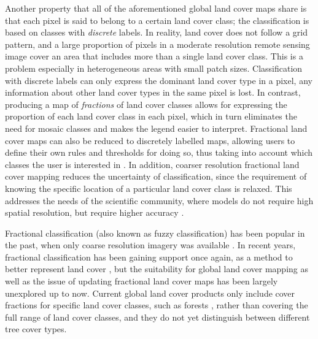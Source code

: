 \documentclass[10pt]{article}
\begin{document}
\begin{mdframed}[style=table,frametitle=\textbf{7. DETAILED DESCRIPTION OF THE RESEARCH PLAN} (max. 2500 words + 1 page literature list)]
Another property that all of the aforementioned global land cover maps share is that each pixel is said to belong to a certain land cover class; the classification is based on classes with \textit{discrete} labels. In reality, land cover does not follow a grid pattern, and a large proportion of pixels in a moderate resolution remote sensing image cover an area that includes more than a single land cover class. This is a problem especially in heterogeneous areas with small patch sizes. Classification with discrete labels can only express the dominant land cover type in a pixel, any information about other land cover types in the same pixel is lost. In contrast, producing a map of \textit{fractions} of land cover classes allows for expressing the proportion of each land cover class in each pixel, which in turn eliminates the need for mosaic classes and makes the legend easier to interpret. Fractional land cover maps can also be reduced to discretely labelled maps, allowing users to define their own rules and thresholds for doing so, thus taking into account which classes the user is interested in \citep{tsendbazar_integrating_2017}. In addition, coarser resolution fractional land cover mapping reduces the uncertainty of classification, since the requirement of knowing the specific location of a particular land cover class is relaxed. This addresses the needs of the scientific community, where models do not require high spatial resolution, but require higher accuracy \citep{bontemps_revisiting_2012}.

Fractional classification (also known as fuzzy classification) has been popular in the past, when only coarse resolution imagery was available \citep{foody_approaches_1996, adams_classification_1995, amo_spectral_2002}. In recent years, fractional classification has been gaining support once again, as a method to better represent land cover \citep{gessner_estimating_2013}, but the suitability for global land cover mapping as well as the issue of updating fractional land cover maps has been largely unexplored up to now. Current global land cover products only include cover fractions for specific land cover classes, such as forests \citep{hansen_global_2003}, rather than covering the full range of land cover classes, and they do not yet distinguish between different tree cover types.



\end{mdframed}
\end{document}
